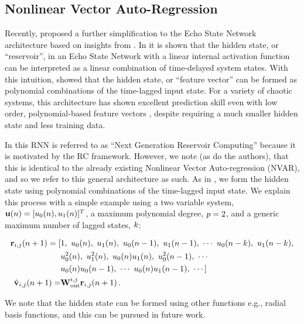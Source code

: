 \subsection{Nonlinear Vector Auto-Regression}
\label{subsec:nvar}

Recently, \citet{gauthier_next_2021} proposed a further simplification to the
Echo State Network architecture
based on insights from \citet{bollt_explaining_2021}.
In \citet{bollt_explaining_2021} it is shown that the hidden state, or
``reservoir'', in an Echo State Network with a linear internal activation
function can be interpreted as a linear combination
of time-delayed system states.
With this intuition, \citet{gauthier_next_2021} showed that the hidden state, or
``feature vector'' can be formed as polynomial combinations of the
time-lagged input state.
For a variety of chaotic systems, this architecture has shown excellent prediction skill
even with low order, polynomial-based feature vectors
\citep{chen_next_2022,barbosa_learning_2022,gauthier_next_2021}, despite requiring a much
smaller hidden state and less training data.


In \citet{gauthier_next_2021} this RNN is referred to as ``Next Generation
Reservoir Computing'' because it is motivated by the RC framework.
However, we note (as do the authors), that this is identical to the already
existing Nonlinear Vector Auto-regression (NVAR), and so we refer to this general architecture as
such.
As in \citet{gauthier_next_2021,chen_next_2022}, we form the hidden state using
polynomial combinations of the time-lagged input state.
We explain this process with a simple example using a two variable system,
$\mathbf{u}(n) = [u_0(n), u_1(n)]^T$,
a maximum polynomial degree,
$p=2$, and a generic maximum number of lagged states, $k$:
\begin{linenomath*}\begin{equation}
    \begin{aligned}
        \mathbf{r}_{i,j}(n+1)
        =
        [&1, \,\,
        u_0(n), \,\, u_1(n), \,\,
        u_0(n-1),\,\, u_1(n-1), \,\,
        \cdots \,\,
        u_0(n-k), \,\, u_1(n-k), \\
         &u_0^2(n), \,\, u_1^2(n), \,\, u_0(n)u_1(n), \,\,
        u_0^2(n-1), \,\, \cdots \\
         &u_0(n)u_0(n-1), \,\, \cdots \,\,
        u_0(n)u_1(n-1), \,\, \cdots
        ] \\
        \hat{\mathbf{v}}_{i,j}(n+1) = &\mathbf{W}_\text{out}^{i,j} \mathbf{r}_{i,j}(n+1) \, .
    \end{aligned}
\end{equation}\end{linenomath*}
We note that the hidden state can be formed using other functions e.g., radial
basis functions, and this can be pursued in future work.

